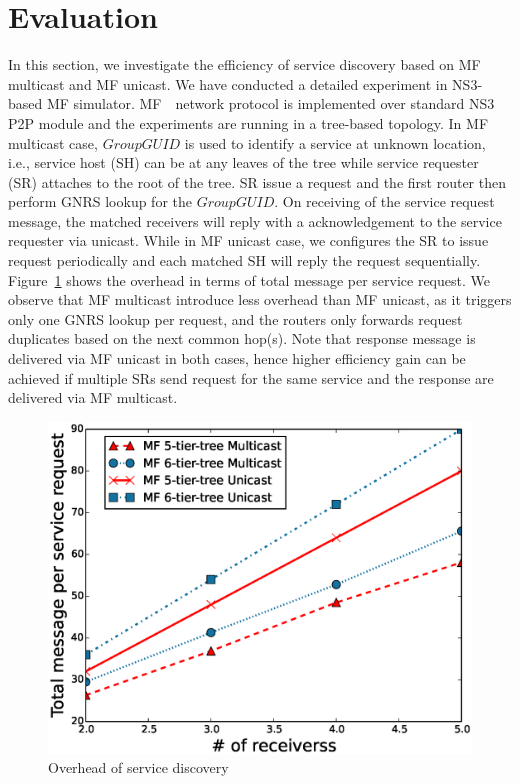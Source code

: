 \section{Evaluation}
In this section, we investigate the efficiency of service discovery based on MF multicast and MF unicast. We have conducted a detailed experiment in NS3-based MF simulator.  MF　network protocol is implemented over standard NS3 P2P module and the experiments are running in a tree-based topology. In MF multicast case, $Group GUID$ is used to identify a service at unknown location, i.e., service host (SH) can be at any leaves of the tree while service requester (SR) attaches to the root of the tree. SR issue a request and the first router then perform  GNRS lookup for the $Group GUID$. On receiving of the service request message, the matched receivers will reply with a acknowledgement to the service requester via unicast. While in MF unicast case, we configures the SR to issue request periodically and each matched SH will reply the request sequentially. Figure~\ref{fig:mf_over} shows the overhead in terms of total message per service request. We observe that MF multicast introduce less overhead than MF unicast, as it triggers only one GNRS lookup per request, and the routers only forwards request duplicates based on the next common hop(s). Note that response message is delivered via MF unicast in both cases, hence higher efficiency gain can be achieved if multiple  SRs send request for the same service and the response are delivered via MF multicast. 
     
\begin{figure}
\includegraphics[width=\columnwidth]{figure/multicast_mf_overhead.eps}
\caption{\label{fig:mf_over}Overhead of service discovery}
\end{figure}

